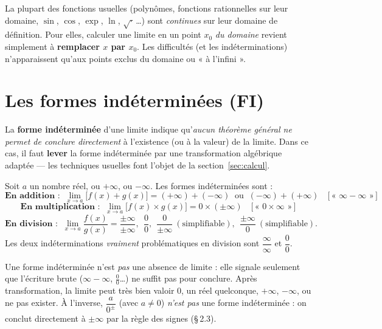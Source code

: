 \documentclass[11pt,a4paper]{article}
\begin{document}
\begin{remarque}
La plupart des fonctions usuelles (polynômes, fonctions rationnelles sur leur domaine,
$\sin$, $\cos$, $\exp$, $\ln$, $\sqrt{\cdot}$\,\dots) sont \emph{continues} sur leur domaine de
définition. Pour elles, calculer une limite en un point $x_0$ \emph{du domaine} revient simplement
à \textbf{remplacer $x$ par $x_0$}. Les difficultés (et les indéterminations) n'apparaissent
qu'aux points exclus du domaine ou « à l'infini ».
\end{remarque}

\section{Les formes indéterminées (FI)}

\begin{definition}
La \textbf{forme indéterminée} d'une limite indique qu'\emph{aucun théorème général ne permet de
conclure directement} à l'existence (ou à la valeur) de la limite. Dans ce cas, il faut
\textbf{lever} la forme indéterminée par une transformation algébrique adaptée — les techniques
usuelles font l'objet de la section~\ref{sec:calcul}.
\end{definition}

\begin{theoreme}
Soit $a$ un nombre réel, ou $+\infty$, ou $-\infty$. Les formes indéterminées sont :
\[
\textbf{En addition : }\ \lim_{x\to a}\bigl[f(x)+g(x)\bigr]=(+\infty)+(-\infty)\ \text{ ou }\ (-\infty)+(+\infty)\quad\bigl[\,\text{« }\infty-\infty\text{ »}\,\bigr]
\]
\[
\textbf{En multiplication : }\ \lim_{x\to a}\bigl[f(x)\times g(x)\bigr]=0\times(\pm\infty)\quad\bigl[\,\text{« }0\times\infty\text{ »}\,\bigr]
\]
\[
\textbf{En division : }\ \lim_{x\to a}\frac{f(x)}{g(x)}=\frac{\pm\infty}{\pm\infty},\ \ \frac{0}{0},\ \ \frac{0}{\pm\infty}\ (\text{simplifiable}),\ \ \frac{\pm\infty}{0}\ (\text{simplifiable}).
\]
Les deux indéterminations \emph{vraiment} problématiques en division sont $\dfrac{\infty}{\infty}$ et $\dfrac{0}{0}$.
\end{theoreme}

\begin{attention}
Une forme indéterminée n'est \emph{pas} une absence de limite : elle signale seulement que
l'écriture brute ($\infty-\infty$, $\tfrac00$\dots) ne suffit pas pour conclure. Après
transformation, la limite peut très bien valoir $0$, un réel quelconque, $+\infty$, $-\infty$, ou
ne pas exister. À l'inverse, $\dfrac{a}{0^{\pm}}$ (avec $a\neq 0$) \emph{n'est pas} une forme
indéterminée : on conclut directement à $\pm\infty$ par la règle des signes (\S\,2.3).
\end{attention}
\end{document}
